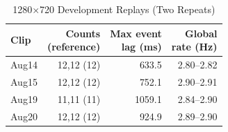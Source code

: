 \begin{table}[!t]
\caption{1280$\times$720 Development Replays (Two Repeats)}
\label{tab:hdreplay}
\centering\small
\begin{tabular}{lrrr}
\toprule
Clip & \shortstack{Counts\\(reference)} & \shortstack{Max event\\lag (ms)} & \shortstack{Global\\rate (Hz)}\\
\midrule
Aug14 & 12,12 (12) & 633.5 & 2.80--2.82\\
Aug15 & 12,12 (12) & 752.1 & 2.90--2.91\\
Aug19 & 11,11 (11) & 1059.1 & 2.84--2.90\\
Aug20 & 12,12 (12) & 924.9 & 2.89--2.90\\
\bottomrule
\end{tabular}
\end{table}
